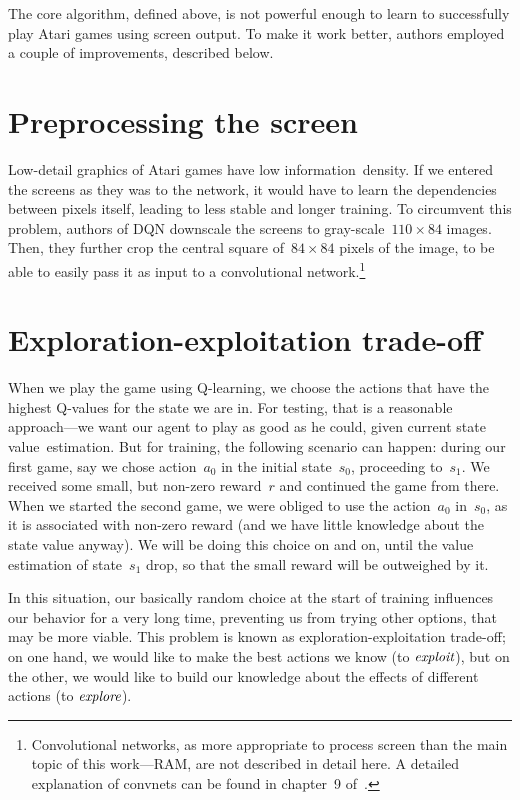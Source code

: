 The core algorithm, defined above, is not powerful enough to learn to successfully play Atari games using screen output. To make it work better, authors employed a couple of improvements, described below.

\section{Preprocessing the screen}
Low-detail graphics of Atari games have low information~density. If we entered the screens as they was to the network, it would have to learn the dependencies between pixels itself, leading to less stable and longer training. To circumvent this problem, authors of DQN downscale the screens to gray-scale~$110 \times 84$ images. Then, they further crop the central square of~$84 \times 84$ pixels of the image, to be able to easily pass it as input to a convolutional network.\footnote{Convolutional networks, as more appropriate to process screen than the main topic of this work---RAM, are not described in detail here. A detailed explanation of convnets can be found in chapter~9 of~\cite{dlbook}.}

\section{Exploration-exploitation trade-off}
When we play the game using Q-learning, we choose the actions that have the highest Q-values for the state we are in. For testing, that is a reasonable approach---we want our agent to play as good as he could, given current state value~estimation. But for training, the following scenario can happen: during our first game, say we chose action~$a_0$ in the initial state~$s_0$, proceeding to~$s_1$. We received some small, but non-zero reward~$r$ and continued the game from there. When we started the second game, we were obliged to use the action~$a_0$ in~$s_0$, as it is associated with non-zero reward (and we have little knowledge about the state value anyway). We will be doing this choice on and on, until the value estimation of state~$s_1$ drop, so that the small reward will be outweighed by it.

In this situation, our basically random choice at the start of training influences our behavior for a very long time, preventing us from trying other options, that may be more viable. This problem is known as exploration-exploitation trade-off; on one hand, we would like to make the best actions we know (to $\emph{exploit}$), but on the other, we would like to build our knowledge about the effects of different actions (to $\emph{explore}$).

